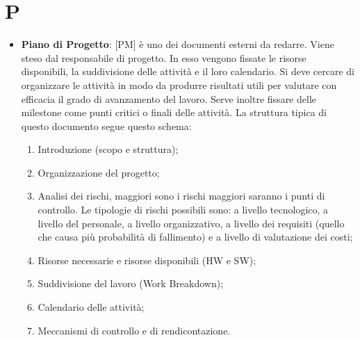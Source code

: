 %
%
%

\section{P}

\begin{itemize}
	\item \textbf{Piano di Progetto}: [PM] è uno dei documenti esterni da redarre. Viene steso dal responsabile di progetto. \newline
In esso vengono fissate le risorse disponibili, la suddivisione delle attività e il loro calendario. \newline
Si deve cercare di organizzare le attività in modo da produrre risultati utili per valutare con efficacia il grado di avanzamento del lavoro. \newline
Serve inoltre fissare delle milestone come punti critici o finali delle attività. \newline
La struttura tipica di questo documento segue questo schema:
	\begin{enumerate}
		\item Introduzione (scopo e struttura);
		\item Organizzazione del progetto;
		\item Analisi dei rischi, maggiori sono i rischi maggiori saranno i punti di controllo. \newline
Le tipologie di rischi possibili sono: a livello tecnologico, a livello del personale, a livello organizzativo, a livello dei requisiti (quello che causa più probabilità di fallimento) e a livello di valutazione dei costi;
		\item Risorse necessarie e risorse disponibili (HW e SW);
		\item Suddivisione del lavoro (Work Breakdown);
		\item Calendario delle attività;
		\item Meccanismi di controllo e di rendicontazione.
	\end{enumerate}
 


\end{itemize}
